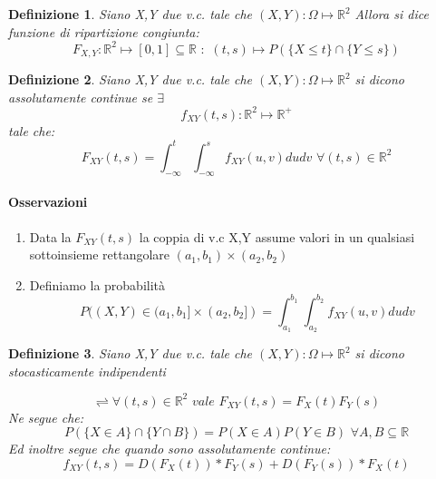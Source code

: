 \documentclass{article}
\newtheorem{definition}{Definizione}[section]
\begin{document}
                \begin{definition} Siano X,Y due v.c. tale che  $(X,Y)\colon \Omega \mapsto \mathbb{R}^2$
                Allora si dice funzione di ripartizione congiunta: 
                    $$
                        F_{X,Y} \colon \mathbb{R}^2 \mapsto [0,1] \subseteq \mathbb{R}\,\,:\,\,
                        (t,s)\longmapsto P(\{X\leq t\}\cap\{Y\leq s\})
                    $$
                \end{definition}
                
                \begin{definition} Siano X,Y due v.c. tale che  $(X,Y)\colon \Omega \mapsto \mathbb{R}^2$ si dicono assolutamente continue se $\exists$
                    $$
                        f_{XY}(t,s)\colon \mathbb{R}^2 \mapsto  \mathbb{R}^+
                    $$
                    tale che: 
                            $$
                                F_{XY}(t,s) = \int_{-\infty}^{t}\int_{-\infty}^{s} f_{XY}(u,v)dudv \,\, 
                                \forall (t,s) \in \mathbb{R}^2
                            $$
                    
                 \end{definition}
                 
                 
                 \paragraph{Osservazioni}
                \begin{enumerate}
                    \item Data la $F_{XY}(t,s)$ la coppia di v.c X,Y assume valori in un qualsiasi sottoinsieme rettangolare $(a_1,b_1)\times(a_2,b_2)$
                    \item Definiamo la probabilità 
                    $$
                        P((X,Y)\in (a_1,b_1]\times(a_2,b_2]) = \int_{a_1}^{b_1}\int_{a_2}^{b_2} f_{XY}(u,v)dudv
                    $$
                \end{enumerate}
                
                 \begin{definition}Siano X,Y due v.c. tale che  $(X,Y)\colon \Omega \mapsto \mathbb{R}^2$ 
                 si dicono stocasticamente indipendenti   
                    
                 $$
                    \rightleftharpoons
                   \forall (t,s)\in \mathbb{R}^2 \,\,vale\,\, F_{XY}(t,s)=F_X(t)F_Y(s)
                 $$
                 Ne segue che: 
                    $$
                        P(\{X\in A\}\cap \{Y\cap B\}) = P(X\in A) P(Y\in B) \,\, \forall           A,B\subseteq \mathbb{R}
                    $$
                Ed inoltre segue che quando sono assolutamente continue: 
                $$
                    f_{XY}(t,s) = D(F_X(t))*F_Y(s) + D(F_Y(s))*F_X(t) 
                $$
                
                 \end{definition}
                 
\end{document}
